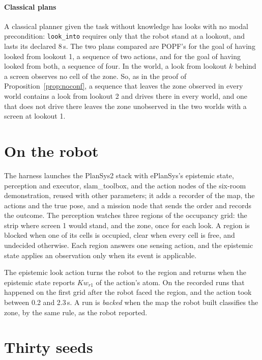 \documentclass[11pt,a4paper]{article}
\theoremstyle{definition}
\newcommand{\Kw}[1]{\mathit{Kw}_{#1}}
\newcommand{\code}[1]{\texttt{\small #1}}
\begin{document}
\paragraph{Classical plans}
A classical planner given the task without knowledge has looks with no modal
precondition: \code{look\_into} requires only that the robot stand at a lookout,
and lasts its declared 8\,s. The two plans compared are POPF's for
the goal of having looked from lookout 1, a sequence of two actions, and for the
goal of having looked from both, a sequence of four. In the world, a look from
lookout $k$ behind a screen observes no cell of the zone. So, as in the proof of
Proposition~\ref{prop:noconf}, a sequence that leaves the zone observed in every
world contains a look from lookout 2 and drives there in every world, and one
that does not drive there leaves the zone unobserved in the two worlds with a
screen at lookout 1.

\section{On the robot}

The harness launches the PlanSys2 stack with ePlanSys's epistemic state,
perception and executor, slam\_toolbox, and the action nodes of the six-room
demonstration, reused with other parameters; it adds a recorder of the map, the
actions and the true pose, and a mission node that sends the order and records
the outcome. The perception watches three regions of the occupancy grid: the
strip where screen 1 would stand, and the zone, once for each look. A region is
blocked when one of its cells is occupied, clear when every cell is free, and
undecided otherwise. Each region answers one sensing action, and the epistemic
state applies an observation only when its event is applicable.

The epistemic look action turns the robot to the region and returns when the
epistemic state reports $\Kw{r1}$ of the action's atom. On the recorded runs
that happened on the first grid after the robot faced the region, and the action
took between 0.2 and 2.3\,s. A run is \emph{backed} when the map the robot built
classifies the zone, by the same rule, as the robot reported.

\section{Thirty seeds}
\end{document}
